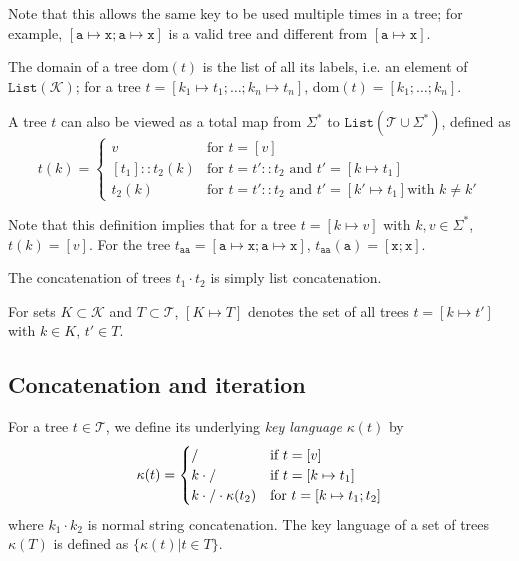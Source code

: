 \documentclass[12pt,fleqn]{amsart}
\newcommand{\ensmath}[1]{\ensuremath{#1}\xspace}
\newcommand{\tree}[1]{\ensmath{[#1]}}
\newcommand{\conc}[2]{\ensmath{#1\cdot #2}}
\newcommand{\Trees}{\ensmath{\mathcal T}}
\newcommand{\Words}{\ensmath{\Sigma^*}}
\newcommand{\tmap}[2]{\ensmath{#1\mapsto #2}}
\newcommand{\tmaptt}[2]{\ensmath{{\mathtt #1}\mapsto {\mathtt #2}}}
\newcommand{\dom}[1]{\ensmath{\mathrm{dom}(#1)}}
\newcommand{\List}[1]{\ensmath{\mathtt{List(#1)}}}
\newcommand{\Keys}{\ensmath{\mathcal{K}}}
\newcommand{\key}[1]{\ensmath{\kappa(#1)}}
\begin{document}
Note that this allows the same key to be used multiple times in a tree; for
example, $[\tmaptt{a}{x}; \tmaptt{a}{x}]$ is a valid tree and
different from $[\tmaptt{a}{x}]$.

The domain of a tree $\dom{t}$ is the list of all its labels, i.e. an
element of $\List{\Keys}$; for a tree $t =
\tree{\tmap{k_1}{t_1};\ldots;\tmap{k_n}{t_n}}$, $\dom{t} =
     [k_1;\ldots;k_n].$

A tree $t$ can also be viewed as a total map from \Words to
$\List{\Trees\cup\Words}$, defined as
\begin{equation*}
  t(k) = 
  \begin{cases}
    v & \text{for } t = \tree{v}\\
    [t_1] :: t_2(k) & \text{for } t = t' :: t_2 
                      \text{ and } t' = \tree{\tmap{k}{t_1}}\\
    t_2(k) & \text{for } t = t' :: t_2 
             \text{ and } t' = \tree{\tmap{k'}{t_1}} \text{with } k\neq k'
  \end{cases}
\end{equation*}

Note that this definition implies that for a tree $t = \tree{\tmap{k}{v}}$
with $k,v\in\Words$, $t(k)=[v].$ For the tree $t_{\mathtt{aa}} = [\tmaptt{a}{x};
  \tmaptt{a}{x}]$, $t_{\mathtt{aa}}(\mathtt a) = [\mathtt x; \mathtt x]$.

The concatenation of trees $\conc{t_1}{t_2}$ is simply list concatenation.

For sets $K\subset\Keys$ and $T\subset\Trees$, $\tree{\tmap{K}{T}}$
denotes the set of all trees $t = \tree{\tmap{k}{t'}}$ with $k\in K$, $t'
\in T$.

\subsection{Concatenation and iteration}
For a tree $t\in \Trees$, we define its underlying \emph{key language}
$\key{t}$ by
\begin{equation*}
  \key{t} = \begin{cases}
    {\tt /} & \text{if } t = \tree{v}\\
    k \cdot {\mathtt /} & \text{if } t = \tree{\tmap{k}{t_1}}\\
    k\cdot {\mathtt /}\cdot \key{t_2} & \text{for } t = \tree{\tmap{k}{t_1};t_2}
  \end{cases}
\end{equation*}
where $\conc{k_1}{k_2}$ is normal string concatenation. The key language of
a set of trees $\key{T}$ is defined as $\{\key{t} | t \in T\}$.
\end{document}
